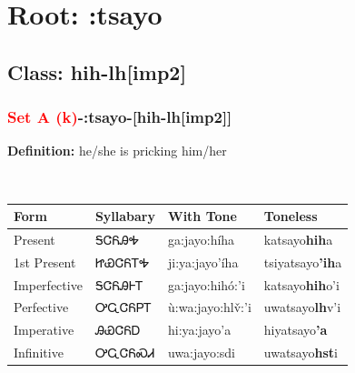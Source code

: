 \needspace{4in}
\section*{Root: :tsayo}
\nopagebreak
{}
\needspace{3in}
\subsection*{Class: hih-lh[imp2]}
\nopagebreak
\needspace{2in}
\subsubsection*{\textcolor{Red}{Set A (k)}{-}\textbf{:tsayo}{-}[hih-lh[imp2]]}
\nopagebreak
\textbf{Definition: } he/she is pricking him/her
\\[0.5em]
\begin{tabularx}{\textwidth}{l X X X}%
\toprule%
\textbf{Form}&\textbf{Syllabary}&\textbf{With Tone}&\textbf{Toneless}\\%
\midrule%
Present&ᎦᏣᏲᎯᎭ&ga:jayo:híha&katsayo\textbf{hih}a\\%
1st Present&ᏥᏯᏣᏲᎢᎭ&ji:ya:jayo’íha&tsiyatsayo\textbf{'ih}a\\%
Imperfective&ᎦᏣᏲᎯᎰᎢ&ga:jayo:hihó:’i&katsayo\textbf{hih}o'i\\%
Perfective&ᎤᏩᏣᏲᏢᎢ&ù:wa:jayo:hlv̌:’i&uwatsayo\textbf{lh}v'i\\%
Imperative&ᎯᏯᏣᏲᎠ&hi:ya:jayo’a&hiyatsayo\textbf{'a}\\%
Infinitive&ᎤᏩᏣᏲᏍᏗ&uwa:jayo:sdi&uwatsayo\textbf{hst}i\\%
\bottomrule%
\end{tabularx}
\\[1em]